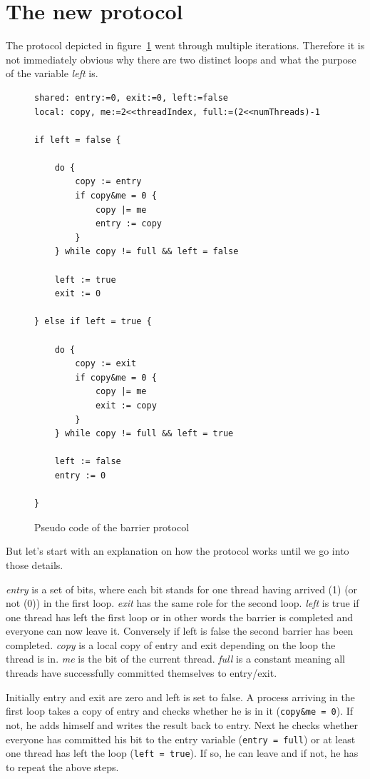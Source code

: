 \documentclass[a4paper, 10pt]{article}
\begin{document}
\section{The new protocol}
The protocol depicted in figure~\ref{fig:barrier-source-code} went through multiple iterations. Therefore it is not immediately obvious why there are two distinct loops and what the purpose of the variable \emph{left} is.
\begin{figure}[htbp]
	\centering
	\begin{lstlisting}
shared: entry:=0, exit:=0, left:=false
local: copy, me:=2<<threadIndex, full:=(2<<numThreads)-1

if left = false {

	do {
		copy := entry
		if copy&me = 0 {
			copy |= me
			entry := copy
		}
	} while copy != full && left = false

	left := true
	exit := 0

} else if left = true {

	do {
		copy := exit
		if copy&me = 0 {
			copy |= me
			exit := copy
		}
	} while copy != full && left = true

	left := false
	entry := 0

}
	\end{lstlisting}
	\caption{Pseudo code of the barrier protocol}
	\label{fig:barrier-source-code}
\end{figure}
But let's start with an explanation on how the protocol works until we go into those details.

\emph{entry} is a set of bits, where each bit stands for one thread having arrived (1) (or not (0)) in the first loop. \emph{exit} has the same role for the second loop. \emph{left} is true if one thread has left the first loop or in other words the barrier is completed and everyone can now leave it. Conversely if left is false the second barrier has been completed. \emph{copy} is a local copy of entry and exit depending on the loop the thread is in. \emph{me} is the bit of the current thread. \emph{full} is a constant meaning all threads have successfully committed themselves to entry/exit.

Initially entry and exit are zero and left is set to false. A process arriving in the first loop takes a copy of entry and checks whether he is in it (\texttt{copy\&me = 0}). If not, he adds himself and writes the result back to entry. Next he checks whether everyone has committed his bit to the entry variable (\texttt{entry = full}) or at least one thread has left the loop (\texttt{left = true}). If so, he can leave and if not, he has to repeat the above steps.
\end{document}

